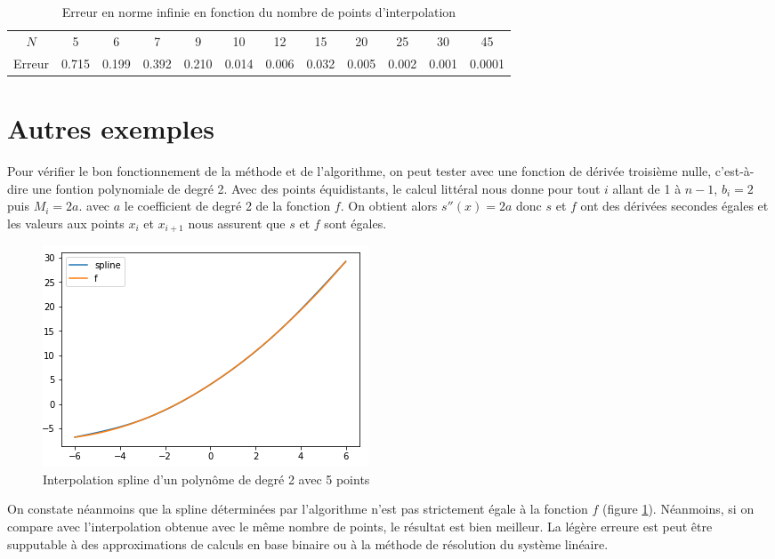 \begin{table}[h]
  \centering
\begin{tabular}{cccccccccccc}
    $N$ & 5 & 6 & 7 & 9 & 10 & 12 & 15 & 20 & 25 & 30 & 45  \\
   Erreur & 0.715 & 0.199 & 0.392 & 0.210 & 0.014 & 0.006 & 0.032 & 0.005 & 0.002 & 0.001 & 0.0001 \\
\end{tabular}
  \caption{Erreur en norme infinie en fonction du nombre de points d'interpolation}
  \label{table:errspl}
\end{table}


\section{Autres exemples}

Pour vérifier le bon fonctionnement de la méthode et de l'algorithme, on peut tester avec une fonction de dérivée troisième nulle,
c'est-à-dire une fontion polynomiale de degré 2. Avec des points équidistants, le calcul littéral nous donne pour tout $i$ allant de
1 à $n-1$, $b_i = 2$ puis $M_i = 2a$. avec $a$ le coefficient de degré 2 de la fonction $f$. On obtient alors $s''(x) = 2a$ donc $s$ et $f$
ont des dérivées secondes égales et les valeurs aux points $x_i$ et $x_{i+1}$ nous assurent que $s$ et $f$ sont égales.

\begin{figure}[h]
  \centering
  \includegraphics[scale=1.0]{fig9}
  \caption{Interpolation spline d'un polynôme de degré 2 avec 5 points}
  \label{fig:7:noerr}
\end{figure}

On constate néanmoins que la spline déterminées par l'algorithme n'est pas strictement égale à la fonction $f$ (figure \ref{fig:7:noerr}). Néanmoins, si on compare avec l'interpolation obtenue avec le même nombre de points, le résultat est bien meilleur. La légère erreure est peut être supputable à des approximations de calculs en base binaire ou à la méthode de résolution du système linéaire.

